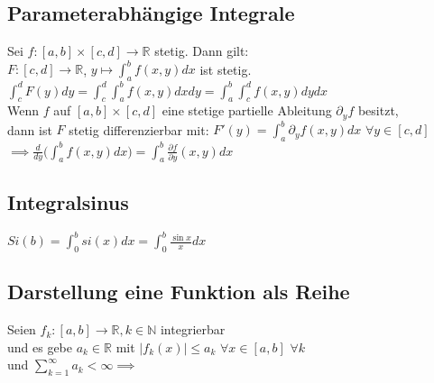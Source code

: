 \documentclass[a4paper,9pt]{extarticle}
\newcommand{\suminfty}[1][k = 1]{\sum_{#1}^{\infty}}
\newcommand{\intab}[1] {\int_{a}^{b} #1 dx}
\begin{document}
	
	\subsection*{Parameterabhängige Integrale}
	Sei $f : [a,b] \times [c,d] → \mathbb{R}$ stetig. Dann gilt: \\
	
	$F : [c,d] → \mathbb{R}$, $y \mapsto \intab{f(x,y)}$ ist stetig. \\
	
	$\int_c^d F(y) dy = \int_c^d \intab{f(x,y)} dy = \intab{\int_c^d f(x,y) dy}$ \\
	
	Wenn $f$ auf $[a,b] \times [c,d]$ eine stetige partielle Ableitung $\partial_y f$ besitzt,\\
	dann ist $F$ stetig differenzierbar mit:
	$F'(y) = \int_a^b \partial_y f(x,y) dx$ $\forall y \in [c,d]$ \\
	$\implies \frac{d}{dy} \Big(\intab{f(x,y)}\Big) = \intab{\frac{\partial f}{\partial y} (x,y)}$
	
	\subsection*{Integralsinus}
	$Si(b) = \int_0^b si(x) dx = \int_0^b \frac{\sin x}{x} dx$
	
	\subsection*{Darstellung eine Funktion als Reihe}
	Seien $f_k : [a,b] → \mathbb{R}, k \in \mathbb{N}$ integrierbar \\
	und es gebe $a_k \in \mathbb{R}$ mit $|f_k(x)| ≤ a_k$ $\forall x \in [a,b]$ $\forall k$ \\
	und $\suminfty[k = 1]{} a_k < ∞ \implies$ \\
	
\end{document}
